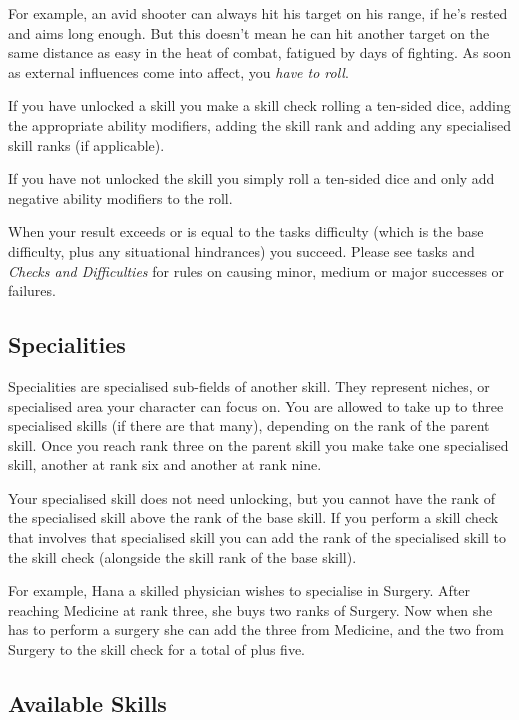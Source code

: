 For example, an avid shooter can always hit his target on his range, if he's
rested and aims long enough. But this doesn't mean he can hit another target
on the same distance as easy in the heat of combat, fatigued by days of
fighting. As soon as external influences come into affect, you \emph{have to
  roll}.

If you have unlocked a skill you make a skill check rolling a ten-sided dice,
adding the appropriate ability modifiers, adding the skill rank and adding any
specialised skill ranks (if applicable).

If you have not unlocked the skill you simply roll a ten-sided dice and only
add negative ability modifiers to the roll.

When your result exceeds or is equal to the tasks difficulty (which is the base
difficulty, plus any situational hindrances) you succeed. Please see tasks and
\emph{Checks and Difficulties} for rules on causing minor, medium or major
successes or failures.

\subsection{Specialities}

Specialities are specialised sub-fields of another skill. They represent
niches, or specialised area your character can focus on. You are allowed to
take up to three specialised skills (if there are that many), depending on
the rank of the parent skill. Once you reach rank three on the parent skill
you make take one specialised skill, another at rank six and another at rank
nine.

Your specialised skill does not need unlocking, but you cannot have the rank
of the specialised skill above the rank of the base skill. If you perform a
skill check that involves that specialised skill you can add the rank of the
specialised skill to the skill check (alongside the skill rank of the base
skill).

For example, Hana a skilled physician wishes to specialise in Surgery. After
reaching Medicine at rank three, she buys two ranks of Surgery. Now when she
has to perform a surgery she can add the three from Medicine, and the two from
Surgery to the skill check for a total of plus five.

\subsection{Available Skills}

